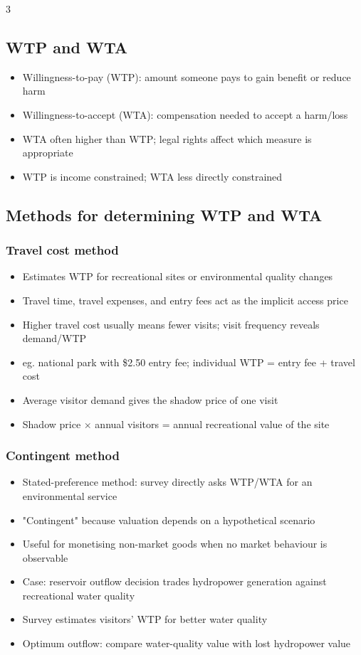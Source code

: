 \documentclass[9pt, landscape, a4paper]{article}
\begin{document}
\begin{multicols*}{3}
\subsection{WTP and WTA}
\begin{itemize}
  \item Willingness-to-pay (WTP): amount someone pays to gain benefit or reduce harm
  \item Willingness-to-accept (WTA): compensation needed to accept a harm/loss
  \item WTA often higher than WTP; legal rights affect which measure is appropriate
  \item WTP is income constrained; WTA less directly constrained
\end{itemize}

\newcolumn
\subsection{Methods for determining WTP and WTA}
\subsubsection{Travel cost method}
\begin{itemize}
  \item Estimates WTP for recreational sites or environmental quality changes
  \item Travel time, travel expenses, and entry fees act as the implicit access price
  \item Higher travel cost usually means fewer visits; visit frequency reveals demand/WTP
  \item eg. national park with \$2.50 entry fee; individual WTP = entry fee + travel cost
  \item Average visitor demand gives the shadow price of one visit
  \item Shadow price $\times$ annual visitors = annual recreational value of the site
\end{itemize}

\subsubsection{Contingent method}
\begin{itemize}
  \item Stated-preference method: survey directly asks WTP/WTA for an environmental service
  \item "Contingent" because valuation depends on a hypothetical scenario
  \item Useful for monetising non-market goods when no market behaviour is observable
  \item Case: reservoir outflow decision trades hydropower generation against recreational water quality
  \item Survey estimates visitors' WTP for better water quality
  \item Optimum outflow: compare water-quality value with lost hydropower value
\end{itemize}


\end{multicols*}
\end{document}
